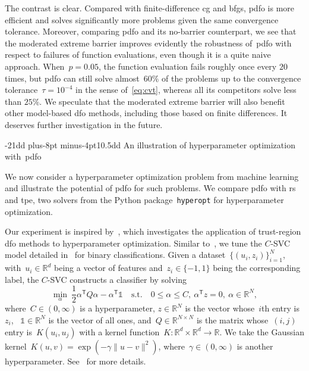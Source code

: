 \documentclass[
    smallextended,  %
    draft,          %
    final,          %
]{svjour3}
\makeatletter
\newcommand{\trs}{{\scriptscriptstyle{\mathsf{T}}}}
\newcommand{\sn}{{\scriptscriptstyle{N}}}
\newcommand{\ones}{\mathbb{1}}
\newcommand{\R}{\mathbb{R}}
\newcommand{\norm}[2][]{#1\lVert#2#1\rVert}
\newcommand{\st}{\text{s.t.}}
\def\subsection{\@startsection{subsection}{2}{\z@}%
    {-21dd plus-8pt minus-4pt}{10.5dd}
     {\normalsize\bfseries}}
\makeatother
\begin{document}
The contrast is clear.
Compared with finite-difference \gls{cg} and \gls{bfgs}, \gls{pdfo} is
more efficient and solves significantly more problems given the same convergence tolerance.
Moreover, comparing \gls{pdfo} and its no-barrier counterpart, we see that the moderated extreme barrier
improves evidently the robustness of~\gls{pdfo} with respect to failures of function evaluations,
even though it is a quite naive approach.
When~$p = 0.05$, the function evaluation fails roughly once every $20$ times,
but \gls{pdfo} can still solve almost~$60\%$ of the problems up to the convergence
tolerance~$\tau = 10^{-4}$ in the sense of~\eqref{eq:cvt}, whereas all its competitors solve less than $25\%$.
We speculate that the moderated extreme barrier will also benefit other model-based \gls{dfo} methods,
including those based on finite differences.
It deserves further investigation in the future.


\subsection{An illustration of hyperparameter optimization with~\gls{pdfo}}
\label{ssec:hypertune}

We now consider a hyperparameter optimization problem from machine learning and illustrate the potential
of \gls{pdfo} for such problems.
We compare \gls{pdfo} with \gls{rs} and \gls{tpe}, two solvers
from the Python package~\texttt{hyperopt} for hyperparameter optimization.

Our experiment is inspired by~\cite[\S~5.3]{Ghanbari_Scheinberg_2017}, which investigates the
application of trust-region \gls{dfo} methods to hyperparameter optimization.
Similar to~\mbox{\cite[\S~5.3]{Ghanbari_Scheinberg_2017}},
we tune the $C$-SVC model detailed in~\cite[\S~2.1]{Chang_Lin_2011} for binary classifications.
Given a dataset~$\{(u_i,z_i)\}_{i=1}^\sn$, with~$u_i \in \R^d$ being a vector of features
and~$z_i \in \{-1,1\}$ being the corresponding label,
the $C$-SVC constructs a classifier by solving
\begin{equation}
    \label{eq:svc}
        \min_{\alpha} ~ \frac{1}{2} \alpha^\trs Q \alpha - \alpha^\trs \ones
        \quad \st \quad 0 \leq \alpha \leq C, ~ \alpha^\trs z = 0, ~\alpha \in\R^{\sn},
\end{equation}
where~$C\in(0,\infty)$ is a hyperparameter, $z\in\R^{\sn}$ is the vector whose~$i$th entry is~$z_i$,
~$\ones\in\R^\sn$
is the vector of all ones, and~$Q\in\R^{\sn\times \sn}$ is the matrix whose~$(i,j)$ entry is~$K(u_i,u_j)$
with a kernel function~$K\mathrel{:} \R^{d}\times\R^{d} \to \R$.
We take the Gaussian kernel~$K(u,v) = \exp(-\gamma\norm{u-v}^2)$, where~$\gamma \in (0,\infty)$ is
another hyperparameter.
See~\cite[\S~2.1]{Chang_Lin_2011} for more details.
\end{document}
